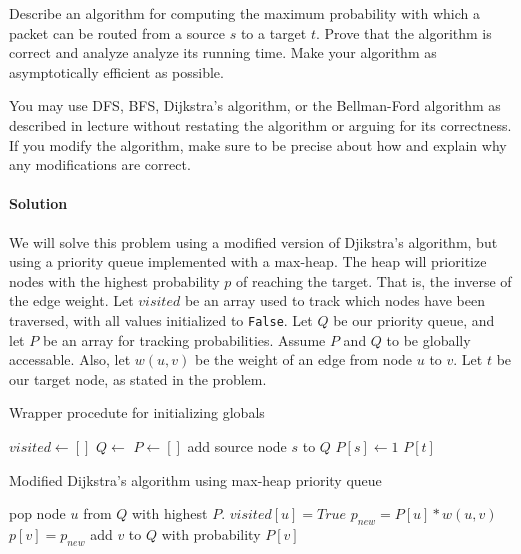 \documentclass[11pt]{article}
\begin{document}
Describe an algorithm for computing the maximum probability with which a packet can be routed from a source $s$ to a target $t$. Prove that the algorithm is correct and analyze analyze its running time. Make your algorithm as asymptotically efficient as possible.

You may use DFS, BFS, Dijkstra's algorithm, or the Bellman-Ford algorithm as described in lecture without restating the algorithm or arguing for its correctness. If you modify the algorithm, make sure to be precise about how and explain why any modifications are correct.


\paragraph{Solution}
We will solve this problem using a modified version of Djikstra's algorithm,
but using a priority queue implemented with a max-heap. The heap will prioritize
nodes with the highest probability $p$ of reaching the target. That is, the
inverse of the edge weight. Let $visited$ be an array used to track which nodes
have been traversed, with all values initialized to \texttt{False}. Let $Q$ be
our priority queue, and let $P$ be an array for tracking probabilities. Assume
$P$ and $Q$ to be globally accessable. Also, let $w(u,v)$ be the weight
of an edge from node $u$ to $v$. Let $t$ be our target node, as stated in the
problem.

\begin{algorithm}
\caption{Wrapper procedute for initializing globals}
\begin{algorithmic}[1]
    \State $visited \leftarrow []$
    \State $Q \leftarrow $ 
    \State $P \leftarrow []$
    \State add source node $s$ to $Q$
    \State $P[s] \leftarrow 1$
    \State {}
    \State \Return $P[t]$
\EndProcedure 
\end{algorithmic}
\end{algorithm}

\begin{algorithm}
\caption{Modified Dijkstra's algorithm using max-heap priority queue}
\begin{algorithmic}[1]
        \State pop node $u$ from $Q$ with highest $P$.
        \State $visited[u] = True$
            \State $p_{new} = P[u] * w(u,v)$
                \State $p[v] = p_{new}$
                \State add $v$ to $Q$ with probability $P[v]$
            \EndIf
        \EndFor
    \EndWhile
\EndProcedure 
\end{algorithmic}
\end{algorithm}
\end{document}
